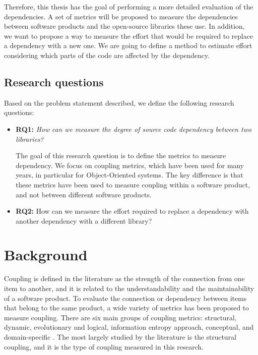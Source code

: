 \documentclass[a4paper]{article}
\begin{document}
Therefore, this thesis has the goal of performing a more detailed evaluation of the dependencies. A set of metrics will be proposed to measure the dependencies between software products and the open-source libraries these use. In addition, we want to propose a way to measure the effort that would be required to replace a dependency with a new one. We are going to define a method to estimate effort considering which parts of the code are affected by the dependency.

\subsection{Research questions}
Based on the problem statement described, we define the following research questions:

\begin{itemize}[noitemsep]
  \item \textbf{RQ1:} \textit{How can we measure the degree of source code dependency between two libraries?}

  The goal of this research question is to define the metrics to measure dependency. We focus on coupling metrics, which have been used for many years, in particular for Object-Oriented systems. The key difference is that these metrics have been used to measure coupling within a software product, and not between different software products.

  \item \textbf{RQ2:} How can we measure the effort required to replace a dependency with another dependency with a different library?
\end{itemize}

\section{Background}\label{section:Background}
Coupling is defined in the literature as the strength of the connection from one item to another, and it is related to the understandability and the maintainability of a software product. To evaluate the connection or dependency between items that belong to the same product, a wide variety of metrics has been proposed to measure coupling.
There are six main groups of coupling metrics: structural, dynamic, evolutionary and logical, information entropy approach, conceptual, and domain-specific  \cite{poshyvanyk2006conceptual}. The most largely studied by the literature is the structural coupling, and it is the type of coupling measured in this research.
\end{document}

